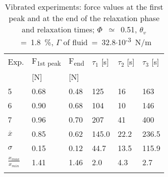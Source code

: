 \begin{table}[h!]
\caption{Vibrated experiments: force values at the first peak and at the end of the relaxation phase and relaxation times; $\Phi$~$\simeq$~0.51, $\theta_v$~=~1.8~\%, $\Gamma$ of fluid~=~32.8$\cdot$10\textsuperscript{-3}~\si{N/m}}
\label{Compact}
\begin{tabular}{llllll}
\hline\noalign{\smallskip}
Exp. &  F\textsubscript{1st peak} & F\textsubscript{end} & $\tau_1$ [s] & $\tau_2$ [s] & $\tau_3$ [s]\\
& [N] & [N] & & &\\
\noalign{\smallskip}\hline\noalign{\smallskip}
5 & 0.68 & 0.48 & 125 & 16 & 163\\
6 & 0.90 & 0.68 & 104 & 10 & 146\\
7 & 0.96 & 0.70 & 207 & 41 & 400\\
\noalign{\smallskip}\hline\noalign{\smallskip}
$\overline{x}$ & 0.85 & 0.62 & 145.0 & 22.2 & 236.5\\
$\sigma$ & 0.15 & 0.12 & 44.7 & 13.5 & 115.9\\
$\frac{x_{max}}{x_{min}}$ & 1.41 & 1.46 & 2.0 & 4.3 & 2.7\\
\noalign{\smallskip}\hline
\end{tabular} 
\end{table}

